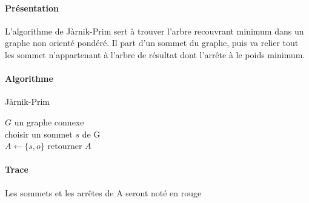 \documentclass[a4paper,12pt]{article}
\begin{document}
\paragraph{Présentation}
L'algorithme de Jàrnik-Prim sert à trouver l'arbre recouvrant minimum dans un graphe non orienté pondéré.
Il part d'un sommet du graphe, puis va relier tout les sommet n'appartenant à l'arbre de résultat dont l'arrête à le poids minimum.

\paragraph{Algorithme}\hfill
\begin{algorithm}
\caption{Jàrnik-Prim}
$G$ un graphe connexe\\
choisir un sommet $s$ de G\\
$A \gets \{s, o\}$\;
retourner $A$
\end{algorithm}

\paragraph{Trace}
Les sommets et les arrêtes de A seront noté en rouge\\
\end{document}
